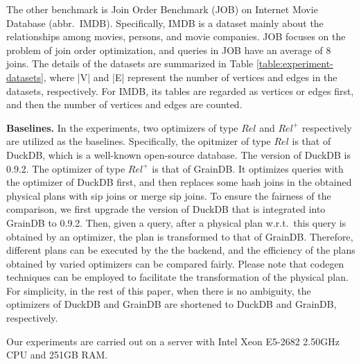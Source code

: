 The other benchmark is Join Order Benchmark (JOB) \cite{job_snb} on Internet Movie Database (abbr.~IMDB).
Specifically, IMDB is a dataset mainly about the relationships among movies, persons, and movie companies.
JOB focuses on the problem of join order optimization, and queries in JOB have an average of 8 joins.
The details of the datasets are summarized in Table \ref{table:experiment-datasets}, where |V| and |E| represent the number of vertices and edges in the datasets, respectively.
For IMDB, its tables are regarded as vertices or edges first, and then the number of vertices and edges are counted.

\textbf{Baselines. }
In the experiments, two optimizers of type $Rel$ and $Rel^+$ respectively are utilized as the baselines.
Specifically, the opitmizer of type $Rel$ is that of DuckDB, which is a well-known open-source database.
The version of DuckDB is 0.9.2.
The optimizer of type $Rel^+$ is that of GrainDB.
It optimizes queries with the optimizer of DuckDB first, and then replaces some hash joins in the obtained physical plans with sip joins or merge sip joins.
To ensure the fairness of the comparison, we first upgrade the version of DuckDB that is integrated into GrainDB to 0.9.2.
Then, given a query, after a physical plan w.r.t.~this query is obtained by an optimizer, the plan is transformed to that of GrainDB.
Therefore, different plans can be executed by the the backend, and the efficiency of the plans obtained by varied optimizers can be compared fairly.
Please note that codegen techniques can be employed to facilitate the transformation of the physical plan.
For simplicity, in the rest of this paper, when there is no ambiguity, the optimizers of DuckDB and GrainDB are shortened to DuckDB and GrainDB, respectively.

Our experiments are carried out on a server with Intel Xeon E5-2682 2.50GHz CPU and 251GB RAM.

